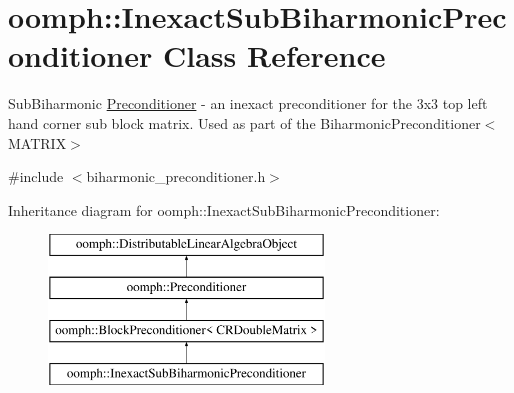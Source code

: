 \hypertarget{classoomph_1_1InexactSubBiharmonicPreconditioner}{}\section{oomph\+:\+:Inexact\+Sub\+Biharmonic\+Preconditioner Class Reference}
\label{classoomph_1_1InexactSubBiharmonicPreconditioner}


Sub\+Biharmonic \hyperlink{classoomph_1_1Preconditioner}{Preconditioner} -\/ an inexact preconditioner for the 3x3 top left hand corner sub block matrix. Used as part of the Biharmonic\+Preconditioner$<$\+M\+A\+T\+R\+I\+X$>$  




{\ttfamily \#include $<$biharmonic\+\_\+preconditioner.\+h$>$}

Inheritance diagram for oomph\+:\+:Inexact\+Sub\+Biharmonic\+Preconditioner\+:\begin{figure}[H]
\begin{center}
\leavevmode
\includegraphics[height=4.000000cm]{classoomph_1_1InexactSubBiharmonicPreconditioner}
\end{center}
\end{figure}
